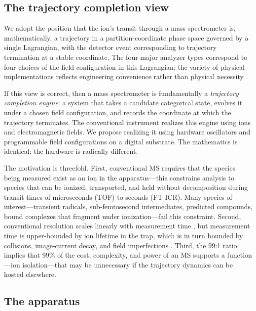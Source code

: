\documentclass[twocolumn,11pt,a4paper]{article}
\theoremstyle{definition}
\theoremstyle{remark}
\begin{document}
\subsection{The trajectory completion view}

We adopt the position that the ion's transit through a mass spectrometer is, mathematically, a trajectory in a partition-coordinate phase space governed by a single Lagrangian, with the detector event corresponding to trajectory termination at a stable coordinate. The four major analyzer types correspond to four choices of the field configuration in this Lagrangian; the variety of physical implementations reflects engineering convenience rather than physical necessity \citep{makarov2000,marshall1998,paul1990,wiley1955}.

If this view is correct, then a mass spectrometer is fundamentally a \emph{trajectory completion engine}: a system that takes a candidate categorical state, evolves it under a chosen field configuration, and records the coordinate at which the trajectory terminates. The conventional instrument realizes this engine using ions and electromagnetic fields. We propose realizing it using hardware oscillators and programmable field configurations on a digital substrate. The mathematics is identical; the hardware is radically different.

The motivation is threefold. First, conventional MS requires that the species being measured exist as an ion in the apparatus---this constrains analysis to species that can be ionized, transported, and held without decomposition during transit times of microseconds (TOF) to seconds (FT-ICR). Many species of interest---transient radicals, sub-femtosecond intermediates, predicted compounds, bound complexes that fragment under ionization---fail this constraint. Second, conventional resolution scales linearly with measurement time \citep{makarov2006,denisov2012}, but measurement time is upper-bounded by ion lifetime in the trap, which is in turn bounded by collisions, image-current decay, and field imperfections \citep{kingdon1923,knight1981}. Third, the 99:1 ratio implies that 99\% of the cost, complexity, and power of an MS supports a function---ion isolation---that may be unnecessary if the trajectory dynamics can be hosted elsewhere.

\subsection{The apparatus}
\end{document}
